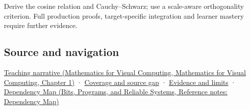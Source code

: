 Derive the cosine relation and Cauchy--Schwarz; use a scale-aware orthogonality criterion. Full production proofs, target-specific integration and learner mastery require further evidence.

\subsection{Source and navigation}\label{appendix-8bc4e8fc547c-source-and-navigation}

\href{../02-Mathematics-for-Visual-Computing/main.pdf\#nameddest=01-foundations-i-ch017-the-dot-product-turns-two-movements-into-a-measurement}{Teaching narrative (Mathematics for Visual Computing, Mathematics for Visual Computing, Chapter 1)} · \hyperref[appendix-fd090d982a15-phase-6---parts-501-600]{Coverage and source gap} · \hyperref[appendix-a103e7846d21-phase-6---source-analysis-and-verification]{Evidence and limits} · \href{../01-Bits-Programs-and-Reliable-Systems/main.pdf\#nameddest=appendix-4ad47bdd269a}{Dependency Map (Bits, Programs, and Reliable Systems, Reference notes: Dependency Map)}
